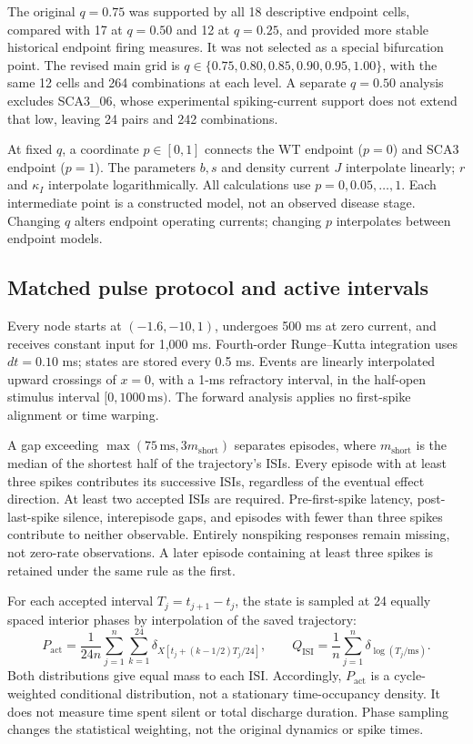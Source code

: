 \documentclass[utf8]{FrontiersinHarvard}
\begin{document}
The original $q=0.75$ was supported by all 18 descriptive endpoint cells, compared with 17 at $q=0.50$ and 12 at $q=0.25$, and provided more stable historical endpoint firing measures. It was not selected as a special bifurcation point. The revised main grid is $q\in\{0.75,0.80,0.85,0.90,0.95,1.00\}$, with the same 12 cells and 264 combinations at each level. A separate $q=0.50$ analysis excludes SCA3\_06, whose experimental spiking-current support does not extend that low, leaving 24 pairs and 242 combinations.

At fixed $q$, a coordinate $p\in[0,1]$ connects the WT endpoint ($p=0$) and SCA3 endpoint ($p=1$). The parameters $b,s$ and density current $J$ interpolate linearly; $r$ and $\kappa_I$ interpolate logarithmically. All calculations use $p=0,0.05,\ldots,1$. Each intermediate point is a constructed model, not an observed disease stage. Changing $q$ alters endpoint operating currents; changing $p$ interpolates between endpoint models.

\subsection{Matched pulse protocol and active intervals}\label{sec:active}
Every node starts at $(-1.6,-10,1)$, undergoes 500 ms at zero current, and receives constant input for 1,000 ms. Fourth-order Runge--Kutta integration uses $dt=0.10$ ms; states are stored every 0.5 ms. Events are linearly interpolated upward crossings of $x=0$, with a 1-ms refractory interval, in the half-open stimulus interval $[0,1000\,\mathrm{ms})$. The forward analysis applies no first-spike alignment or time warping.

A gap exceeding $\max(75\,\mathrm{ms},3m_{\mathrm{short}})$ separates episodes, where $m_{\mathrm{short}}$ is the median of the shortest half of the trajectory's ISIs. Every episode with at least three spikes contributes its successive ISIs, regardless of the eventual effect direction. At least two accepted ISIs are required. Pre-first-spike latency, post-last-spike silence, interepisode gaps, and episodes with fewer than three spikes contribute to neither observable. Entirely nonspiking responses remain missing, not zero-rate observations. A later episode containing at least three spikes is retained under the same rule as the first.

For each accepted interval $T_j=t_{j+1}-t_j$, the state is sampled at 24 equally spaced interior phases by interpolation of the saved trajectory:
\begin{equation}
P_{\mathrm{act}}=\frac{1}{24n}\sum_{j=1}^{n}\sum_{k=1}^{24}\delta_{X[t_j+(k-1/2)T_j/24]},\qquad Q_{\mathrm{ISI}}=\frac{1}{n}\sum_{j=1}^{n}\delta_{\log(T_j/\mathrm{ms})}.\label{eq:active}
\end{equation}
Both distributions give equal mass to each ISI. Accordingly, $P_{\mathrm{act}}$ is a cycle-weighted conditional distribution, not a stationary time-occupancy density. It does not measure time spent silent or total discharge duration. Phase sampling changes the statistical weighting, not the original dynamics or spike times.
\end{document}
